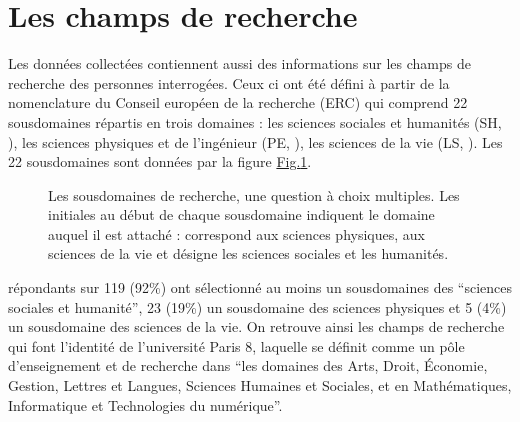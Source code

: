 \documentclass[letterpaper,10pt,english]{jupyterBook}
\begin{document}
\section{Les champs de recherche}
\label{\detokenize{script_analyse/synthese/main_results:les-champs-de-recherche}}
\sphinxAtStartPar
Les données collectées contiennent aussi des informations sur les champs de recherche des personnes interrogées. Ceux ci ont été défini à partir de la nomenclature du Conseil européen de la recherche (ERC) qui comprend 22 sous\sphinxhyphen{}domaines répartis en trois domaines : les sciences sociales et humanités (SH, ), les sciences physiques et de l’ingénieur (PE, ), les sciences de la vie (LS, ). Les 22 sous\sphinxhyphen{}domaines sont données par la figure \hyperref[\detokenize{script_analyse/synthese/main_results:capture-research-fields}]{Fig.\@ \ref{\detokenize{script_analyse/synthese/main_results:capture-research-fields}}}.

\begin{figure}[htbp]
\centering
\capstart

\noindent{}
\caption{Les sous\sphinxhyphen{}domaines de recherche, une question à choix multiples. Les initiales au début de chaque sous\sphinxhyphen{}domaine indiquent le domaine auquel il est attaché :  correspond aux sciences physiques,  aux sciences de la vie et  désigne les sciences sociales et les humanités.}\label{\detokenize{script_analyse/synthese/main_results:capture-research-fields}}\end{figure}

 répondants sur 119 (92\%) ont sélectionné au moins un sous\sphinxhyphen{}domaines des “sciences sociales et humanité”, 23 (19\%) un sous\sphinxhyphen{}domaine des sciences physiques et 5 (4\%) un sous\sphinxhyphen{}domaine des sciences de la vie. On retrouve ainsi les champs de recherche qui font l’identité de l’université Paris 8, laquelle se définit comme un pôle d’enseignement et de recherche dans “les domaines des Arts, Droit, Économie, Gestion, Lettres et Langues, Sciences Humaines et Sociales, et en Mathématiques, Informatique et Technologies du numérique”\sphinxfootnotemark[1].
\end{document}
